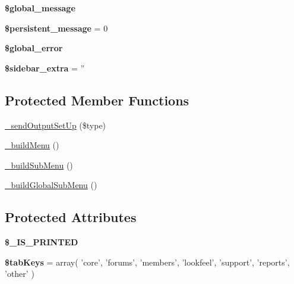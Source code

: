 \begin{DoxyCompactItemize}
\item 
\hypertarget{classadmin_output_ae914deec2494eb82f15da9f8568da893}{{\bfseries \$global\-\_\-message}}\label{classadmin_output_ae914deec2494eb82f15da9f8568da893}

\item 
\hypertarget{classadmin_output_a629f37efef65c81e93d59623e5bb10ff}{{\bfseries \$persistent\-\_\-message} = 0}\label{classadmin_output_a629f37efef65c81e93d59623e5bb10ff}

\item 
\hypertarget{classadmin_output_ad744c69b3f1ea615a356d4e1232cd62e}{{\bfseries \$global\-\_\-error}}\label{classadmin_output_ad744c69b3f1ea615a356d4e1232cd62e}

\item 
\hypertarget{classadmin_output_aba9dba327673261609498d326e022f2e}{{\bfseries \$sidebar\-\_\-extra} = ''}\label{classadmin_output_aba9dba327673261609498d326e022f2e}

\end{DoxyCompactItemize}
\subsection*{Protected Member Functions}
\begin{DoxyCompactItemize}
\item 
\hyperlink{classadmin_output_a2ec9ff7a0fd15664dea44203df476dad}{\-\_\-send\-Output\-Set\-Up} (\$type)
\item 
\hyperlink{classadmin_output_a33db9760905c99fcfa1ad096df6f32ad}{\-\_\-build\-Menu} ()
\item 
\hyperlink{classadmin_output_a4a791734b913fa4162f9474c9f3e1a01}{\-\_\-build\-Sub\-Menu} ()
\item 
\hyperlink{classadmin_output_ae04fb7af48386521b04f4ac6e7e2648c}{\-\_\-build\-Global\-Sub\-Menu} ()
\end{DoxyCompactItemize}
\subsection*{Protected Attributes}
\begin{DoxyCompactItemize}
\item 
\hypertarget{classadmin_output_a8091ebfbe735765de8099f4adfe02e69}{{\bfseries \$\-\_\-\-I\-S\-\_\-\-P\-R\-I\-N\-T\-E\-D}}\label{classadmin_output_a8091ebfbe735765de8099f4adfe02e69}

\item 
\hypertarget{classadmin_output_a2f88bfd5e3922bac4cd227cf52415b60}{{\bfseries \$tab\-Keys} = array( 'core', 'forums', 'members', 'lookfeel', 'support', 'reports', 'other' )}\label{classadmin_output_a2f88bfd5e3922bac4cd227cf52415b60}

\end{DoxyCompactItemize}

